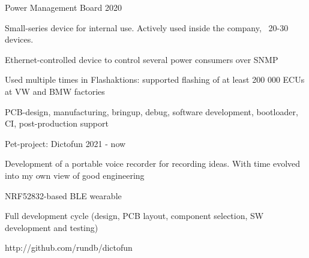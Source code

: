 \begin{cventries}

\cventry
{} %
{Power Management Board} %
{} %
{2020} %
{ %
\begin{cvitems}
\item {Small-series device for internal use. Actively used inside the company, ~20-30 devices. }
\item {Ethernet-controlled device to control several power consumers over SNMP}
\item {Used multiple times in Flashaktions: supported flashing of at least 200 000 ECUs at VW and BMW factories}
\item {PCB-design, manufacturing, bringup, debug, software development, bootloader, CI, post-production support}
\end{cvitems}
}
\newline
\newline


\cventry
{} %
{Pet-project: Dictofun} %
{} %
{2021 - now} %
{ %
\begin{cvitems}
\item {Development of a portable voice recorder for recording ideas. With time evolved into my own view of good engineering}
\item {NRF52832-based BLE wearable}
\item {Full development cycle (design, PCB layout, component selection, SW development and testing)}
\item {http://github.com/rundb/dictofun}
\end{cvitems}
}
\newline
\newline

\end{cventries}